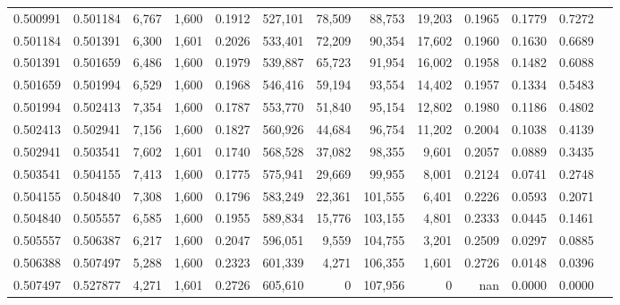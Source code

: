 \begin{tabular}{rrrrrrrrrrrrr}
0.500991 & 0.501184 &  6,767 & 1,600 &                                     0.1912 & 527,101 &  78,509 &  88,753 &  19,203 & 0.1965 & 0.1779 & 0.7272 \\
0.501184 & 0.501391 &  6,300 & 1,601 &                                     0.2026 & 533,401 &  72,209 &  90,354 &  17,602 & 0.1960 & 0.1630 & 0.6689 \\
0.501391 & 0.501659 &  6,486 & 1,600 &                                     0.1979 & 539,887 &  65,723 &  91,954 &  16,002 & 0.1958 & 0.1482 & 0.6088 \\
0.501659 & 0.501994 &  6,529 & 1,600 &                                     0.1968 & 546,416 &  59,194 &  93,554 &  14,402 & 0.1957 & 0.1334 & 0.5483 \\
0.501994 & 0.502413 &  7,354 & 1,600 &                                     0.1787 & 553,770 &  51,840 &  95,154 &  12,802 & 0.1980 & 0.1186 & 0.4802 \\
0.502413 & 0.502941 &  7,156 & 1,600 &                                     0.1827 & 560,926 &  44,684 &  96,754 &  11,202 & 0.2004 & 0.1038 & 0.4139 \\
0.502941 & 0.503541 &  7,602 & 1,601 &                                     0.1740 & 568,528 &  37,082 &  98,355 &   9,601 & 0.2057 & 0.0889 & 0.3435 \\
0.503541 & 0.504155 &  7,413 & 1,600 &                                     0.1775 & 575,941 &  29,669 &  99,955 &   8,001 & 0.2124 & 0.0741 & 0.2748 \\
0.504155 & 0.504840 &  7,308 & 1,600 &                                     0.1796 & 583,249 &  22,361 & 101,555 &   6,401 & 0.2226 & 0.0593 & 0.2071 \\
0.504840 & 0.505557 &  6,585 & 1,600 &                                     0.1955 & 589,834 &  15,776 & 103,155 &   4,801 & 0.2333 & 0.0445 & 0.1461 \\
0.505557 & 0.506387 &  6,217 & 1,600 &                                     0.2047 & 596,051 &   9,559 & 104,755 &   3,201 & 0.2509 & 0.0297 & 0.0885 \\
0.506388 & 0.507497 &  5,288 & 1,600 &                                     0.2323 & 601,339 &   4,271 & 106,355 &   1,601 & 0.2726 & 0.0148 & 0.0396 \\
0.507497 & 0.527877 &  4,271 & 1,601 &                                     0.2726 & 605,610 &       0 & 107,956 &       0 &    nan & 0.0000 & 0.0000 \\
\bottomrule
\end{tabular}
